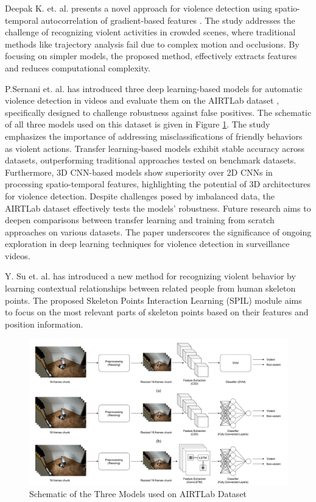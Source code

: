 \noindent Deepak K. et. al. presents a novel approach for violence detection using spatio-temporal autocorrelation of gradient-based features \cite{svm-knn-stacog}. The study addresses the challenge of recognizing violent activities in crowded scenes, where traditional methods like trajectory analysis fail due to complex motion and occlusions. By focusing on simpler models, the proposed method, effectively extracts features and reduces computational complexity.

\noindent P.Sernani et. al. has introduced three deep learning-based models for automatic violence detection in videos and evaluate them on the AIRTLab dataset \cite{airtlab}, specifically designed to challenge robustness against false positives. The schematic of all three models used on this dataset is given in Figure \ref{fig:airtlab}. The study emphasizes the importance of addressing misclassifications of friendly behaviors as violent actions. Transfer learning-based models exhibit stable accuracy across datasets, outperforming traditional approaches tested on benchmark datasets. Furthermore, 3D CNN-based models show superiority over 2D CNNs in processing spatio-temporal features, highlighting the potential of 3D architectures for violence detection. Despite challenges posed by imbalanced data, the AIRTLab dataset effectively tests the models' robustness. Future research aims to deepen comparisons between transfer learning and training from scratch approaches on various datasets. The paper underscores the significance of ongoing exploration in deep learning techniques for violence detection in surveillance videos.

\noindent Y. Su et. al. has introduced a new method for recognizing violent behavior by learning contextual relationships between related people from human skeleton points. The proposed Skeleton Points Interaction Learning (SPIL) module \cite{SPIL} aims to focus on the most relevant parts of skeleton points based on their features and position information. 

\clearpage

\begin{figure}[!htbp]
\centering
\includegraphics[width=1\linewidth]{Images/airtlab.png}
\caption{Schematic of the Three Models used on AIRTLab Dataset}
\label{fig:airtlab}
\end{figure}

